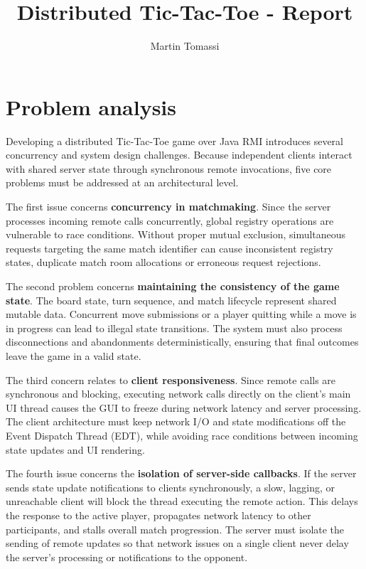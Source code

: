 \documentclass[11pt,a4paper]{article}
\title{Distributed Tic-Tac-Toe - Report}
\author{Martin Tomassi}
\date{}
\begin{document}
\maketitle

\section{Problem analysis}

Developing a distributed Tic-Tac-Toe game over Java RMI introduces several concurrency and system design challenges. Because independent clients interact with shared server state through synchronous remote invocations, five core problems must be addressed at an architectural level.

The first issue concerns \textbf{concurrency in matchmaking}. Since the server processes incoming remote calls concurrently, global registry operations are vulnerable to race conditions. Without proper mutual exclusion, simultaneous requests targeting the same match identifier can cause inconsistent registry states, duplicate match room allocations or erroneous request rejections.

The second problem concerns \textbf{maintaining the consistency of the game state}. The board state, turn sequence, and match lifecycle represent shared mutable data. Concurrent move submissions or a player quitting while a move is in progress can lead to illegal state transitions. The system must also process disconnections and abandonments deterministically, ensuring that final outcomes leave the game in a valid state.

The third concern relates to \textbf{client responsiveness}. Since remote calls are synchronous and blocking, executing network calls directly on the client’s main UI thread causes the GUI to freeze during network latency and server processing. The client architecture must keep network I/O and state modifications off the Event Dispatch Thread (EDT), while avoiding race conditions between incoming state updates and UI rendering.

The fourth issue concerns the \textbf{isolation of server-side callbacks}. If the server sends state update notifications to clients synchronously, a slow, lagging, or unreachable client will block the thread executing the remote action. This delays the response to the active player, propagates network latency to other participants, and stalls overall match progression. The server must isolate the sending of remote updates so that network issues on a single client never delay the server’s processing or notifications to the opponent.
\end{document}

